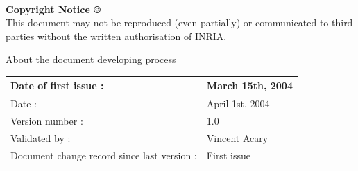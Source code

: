 \textsf{ }\\
\begin{center}
\textbf{Copyright Notice \copyright}\\
This document may not be reproduced (even partially) or communicated to third parties without the written authorisation of INRIA.
\end{center}
\renewcommand{\arraystretch}{1.8}


\pagebreak
\begin{center}
  \textsf{\Large About the document developing process}
\end{center}
\begin{tabular}{|p{}|p{}|}
\hline
Date of first issue : &\textsf{March 15th, 2004}\\
\hline
Date : &\textsf{April 1st, 2004}\\
Version number : &\textsf{1.0}\\ 
Validated by :& \textsf{Vincent Acary}\\
\hline
Document change record since last version : &\textsf{First issue} \\
\hline

\end{tabular}

%



